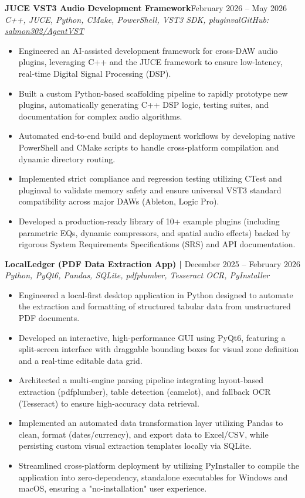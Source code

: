 \documentclass[letterpaper,11pt]{article}
\newcommand{\resumeEntry}[4]{
    \vspace{2pt}
    \noindent\textbf{#1}\hfill{#2}
    \newline
    \noindent\textit{#3}\hfill\textit{#4}
    \vspace{-3pt}
}
\newcommand{\resumeItemListStart}{\begin{itemize}[label=$\bullet$, leftmargin=1.1em, itemsep=0pt, parsep=0pt, topsep=2pt]}
\newcommand{\resumeItemListEnd}{\end{itemize}}
\begin{document}
    \resumeEntry
        {JUCE VST3 Audio Development Framework}
        {February 2026 – May 2026}
        {C++, JUCE, Python, CMake, PowerShell, VST3 SDK, pluginval}
        {GitHub: \href{https://github.com/salmon302/AgentVST}{salmon302/AgentVST}}
    \resumeItemListStart
        \item Engineered an AI-assisted development framework for cross-DAW audio plugins, leveraging C++ and the JUCE framework to ensure low-latency, real-time Digital Signal Processing (DSP).
        \item Built a custom Python-based scaffolding pipeline to rapidly prototype new plugins, automatically generating C++ DSP logic, testing suites, and documentation for complex audio algorithms.
        \item Automated end-to-end build and deployment workflows by developing native PowerShell and CMake scripts to handle cross-platform compilation and dynamic directory routing.
        \item Implemented strict compliance and regression testing utilizing CTest and pluginval to validate memory safety and ensure universal VST3 standard compatibility across major DAWs (Ableton, Logic Pro).
        \item Developed a production-ready library of 10+ example plugins (including parametric EQs, dynamic compressors, and spatial audio effects) backed by rigorous System Requirements Specifications (SRS) and API documentation.
    \resumeItemListEnd

    \resumeEntry
        {LocalLedger (PDF Data Extraction App) | }
        {December 2025 – February 2026}
        {Python, PyQt6, Pandas, SQLite, pdfplumber, Tesseract OCR, PyInstaller}
        {}
    \resumeItemListStart
        \item Engineered a local-first desktop application in Python designed to automate the extraction and formatting of structured tabular data from unstructured PDF documents.
        \item Developed an interactive, high-performance GUI using PyQt6, featuring a split-screen interface with draggable bounding boxes for visual zone definition and a real-time editable data grid.
        \item Architected a multi-engine parsing pipeline integrating layout-based extraction (pdfplumber), table detection (camelot), and fallback OCR (Tesseract) to ensure high-accuracy data retrieval.
        \item Implemented an automated data transformation layer utilizing Pandas to clean, format (dates/currency), and export data to Excel/CSV, while persisting custom visual extraction templates locally via SQLite.
        \item Streamlined cross-platform deployment by utilizing PyInstaller to compile the application into zero-dependency, standalone executables for Windows and macOS, ensuring a "no-installation" user experience.
    \resumeItemListEnd
\end{document}
